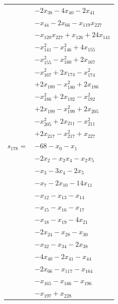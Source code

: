 \begin{longtable}{@{}r@{\;}l@{}}
 & \(\displaystyle -2x_{38} -4x_{40} -2x_{41}\) \\
 & \(\displaystyle -x_{44} -2x_{66} -x_{119}x_{227}\) \\
 & \(\displaystyle -x_{120}x_{227} +x_{126} +24x_{141}\) \\
 & \(\displaystyle -x_{141}^{2} -x_{146}^{2} +4x_{155}\) \\
 & \(\displaystyle -x_{155}^{2} -x_{160}^{2} +2x_{167}\) \\
 & \(\displaystyle -x_{167}^{2} +2x_{174} -x_{174}^{2}\) \\
 & \(\displaystyle +2x_{180} -x_{180}^{2} +2x_{186}\) \\
 & \(\displaystyle -x_{186}^{2} +2x_{192} -x_{192}^{2}\) \\
 & \(\displaystyle +2x_{199} -x_{199}^{2} +2x_{205}\) \\
 & \(\displaystyle -x_{205}^{2} +2x_{211} -x_{211}^{2}\) \\
 & \(\displaystyle +2x_{217} -x_{217}^{2} +x_{227}\) \\[3pt]
\(s_{178}=\) & \(\displaystyle -68 -x_{0} -x_{1}\) \\
 & \(\displaystyle -2x_{2} -x_{2}x_{4} -x_{2}x_{5}\) \\
 & \(\displaystyle -x_{3} -3x_{4} -2x_{5}\) \\
 & \(\displaystyle -x_{7} -2x_{10} -14x_{11}\) \\
 & \(\displaystyle -x_{12} -x_{13} -x_{14}\) \\
 & \(\displaystyle -x_{15} -x_{16} -x_{17}\) \\
 & \(\displaystyle -x_{18} -x_{19} -4x_{21}\) \\
 & \(\displaystyle -2x_{24} -x_{28} -x_{30}\) \\
 & \(\displaystyle -x_{32} -x_{34} -2x_{38}\) \\
 & \(\displaystyle -4x_{40} -2x_{41} -x_{44}\) \\
 & \(\displaystyle -2x_{66} -x_{117} -x_{164}\) \\
 & \(\displaystyle -x_{165} -x_{166} -x_{196}\) \\
 & \(\displaystyle -x_{197} +x_{228}\) \\[3pt]
\end{longtable}
\endgroup

